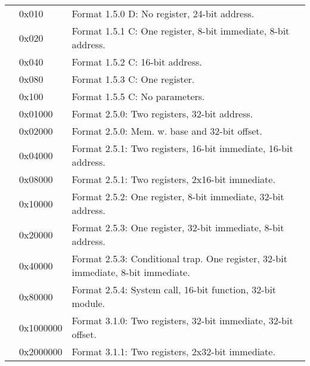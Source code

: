 \documentclass[forwardcom.tex]{subfiles}
\begin{document}
\begin{longtable} {|p{18mm}|p{20mm} p{80mm}|}
  &  0x010 & Format 1.5.0 D: No register, 24-bit address. \\  
  &  0x020 & Format 1.5.1 C: One register, 8-bit immediate, 8-bit address. \\
  &  0x040 & Format 1.5.2 C: 16-bit address. \\
  &  0x080 & Format 1.5.3 C: One register. \\
  &  0x100 & Format 1.5.5 C: No parameters. \\
  
  &  0x01000 & Format 2.5.0: Two registers, 32-bit address. \\
  &  0x02000 & Format 2.5.0: Mem. w. base and 32-bit offset. \\
  &  0x04000 & Format 2.5.1: Two registers, 16-bit immediate, 16-bit address. \\
  &  0x08000 & Format 2.5.1: Two registers, 2x16-bit immediate. \\

  &  0x10000 & Format 2.5.2: One register, 8-bit immediate, 32-bit address. \\
  &  0x20000 & Format 2.5.3: One register, 32-bit immediate, 8-bit address. \\
  &  0x40000 & Format 2.5.3: Conditional trap. One register, 32-bit immediate, 8-bit immediate. \\  
  &  0x80000 & Format 2.5.4: System call, 16-bit function, 32-bit module. \\
  
  & 0x1000000 & Format 3.1.0: Two registers, 32-bit immediate, 32-bit offset. \\
  & 0x2000000 & Format 3.1.1: Two registers, 2x32-bit immediate. \\
\hline
\end{longtable}
\end{document}
